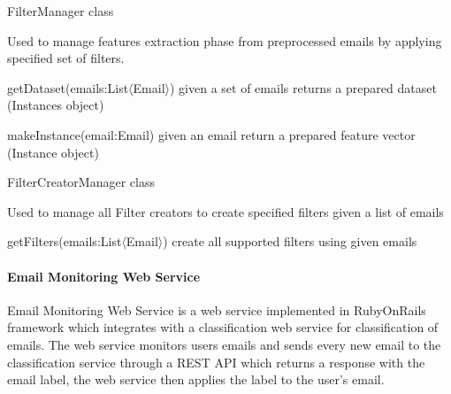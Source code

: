 \begin{my_itemize}
  \item FilterManager class
  \begin{my_desc}
    \item[Purpose] Used to manage features extraction phase from preprocessed emails by applying
      specified set of filters.
    \item[Functions] \hfill
    \begin{my_itemize}
      \item getDataset(emails:List$\langle$Email$\rangle$) given a set of emails returns a prepared dataset (Instances object)
      \item makeInstance(email:Email) given an email return a prepared feature vector (Instance object)
    \end{my_itemize}

  \end{my_desc}

  \item FilterCreatorManager class
  \begin{my_desc}
    \item[Purpose] Used to manage all Filter creators to create specified filters given a list of emails
    \item[Functions] \hfill
    \begin{my_itemize}
      \item getFilters(emails:List$\langle$Email$\rangle$) create all supported filters using given emails
    \end{my_itemize}

  \end{my_desc}

\end{my_itemize}

\paragraph{Email Monitoring Web Service}

Email Monitoring Web Service is a web service implemented in RubyOnRails \cite{ROR} framework which integrates 
with a classification web service for classification of emails. The web service monitors 
users emails and sends every new email to the classification service through a REST API \cite{REST}
which returns a response with the email label, the web service then applies the label to the user’s email.

